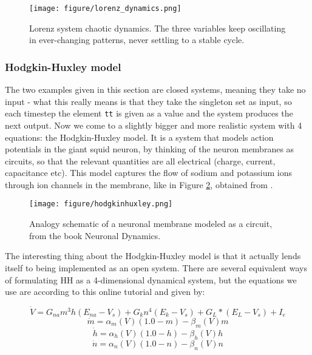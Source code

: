 \begin{figure}
    \centering
    \texttt{[image: figure/lorenz\_dynamics.png]}
    \caption{Lorenz system chaotic dynamics. The three variables keep oscillating in ever-changing patterns, never settling to a stable cycle.}
    \label{fig:lorenz_dynamics}
\end{figure}


\subsubsection{Hodgkin-Huxley model}
The two examples given in this section are closed systems, meaning they take no input - what this really means is that they take the singleton set as input, so each timestep the element \texttt{tt} is given as a value and the system produces the next output. Now we come to a slightly bigger and more realistic system with 4 equations: the Hodgkin-Huxley \cite{hodgkin1952quantitative} model. It is a system that models action potentials in the giant squid neuron, by thinking of the neuron membranes as circuits, so that the relevant quantities are all electrical (charge, current, capacitance etc). This model captures the flow of sodium and potassium ions through ion channels in the membrane, like in Figure \ref{fig:hodgkinhuxleyschematic}, obtained from \cite{gerstner2014neuronal}.

\begin{figure}
    \centering
    \texttt{[image: figure/hodgkinhuxley.png]}
    \caption{Analogy schematic of a neuronal membrane modeled as a circuit, from the book Neuronal Dynamics.}
    \label{fig:hodgkinhuxleyschematic}
\end{figure}

The interesting thing about the Hodgkin-Huxley model is that it actually lends itself to being implemented as an open system. There are several equivalent ways of formulating HH as a 4-dimensional dynamical system, but the equations we use are according to this online tutorial \cite{https://mark-kramer.github.io/Case-Studies-Python/HH.html} and given by:

\begin{equation}
\dot{V} =  G_{na}m^3h(E_{na} - V_s) + G_kn^4(E_k - V_s) + G_L * (E_L - V_s) + I_e
\label{eq:voltage}
\end{equation}
\begin{equation}
\dot{m} = \alpha_m(V)(1.0 - m) - \beta_m(V)m
\label{eq:mhh}
\end{equation}
\begin{equation}
\dot{h} = \alpha_h(V)(1.0 - h) - \beta_h(V)h
\label{eq:hhh}
\end{equation}
\begin{equation}
\dot{n} = \alpha_n(V)(1.0 - n) - \beta_n(V)n   
\label{eq:nhh}
\end{equation}

